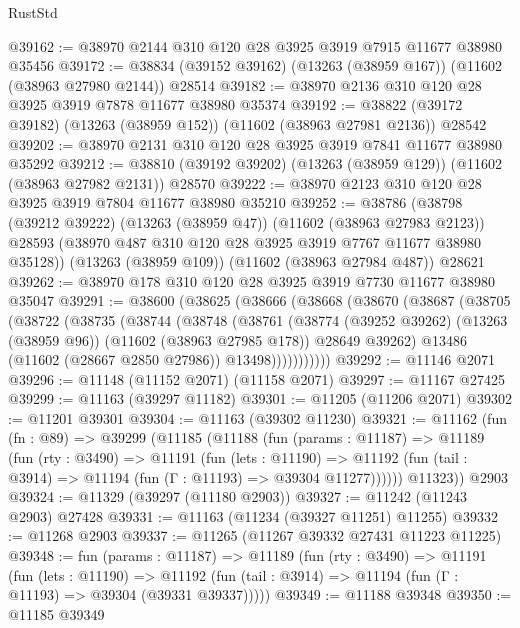 \begin{lexlean}{RustStd}
\begin{coremodule}
@39162 := @38970 @2144 @310 @120 @28 @3925 @3919 @7915 @11677 @38980 @35456
@39172 := @38834 (@39152 @39162) (@13263 (@38959 @167)) (@11602 (@38963 @27980 @2144)) @28514
@39182 := @38970 @2136 @310 @120 @28 @3925 @3919 @7878 @11677 @38980 @35374
@39192 := @38822 (@39172 @39182) (@13263 (@38959 @152)) (@11602 (@38963 @27981 @2136)) @28542
@39202 := @38970 @2131 @310 @120 @28 @3925 @3919 @7841 @11677 @38980 @35292
@39212 := @38810 (@39192 @39202) (@13263 (@38959 @129)) (@11602 (@38963 @27982 @2131)) @28570
@39222 := @38970 @2123 @310 @120 @28 @3925 @3919 @7804 @11677 @38980 @35210
@39252 := @38786
    (@38798
      (@39212 @39222)
      (@13263 (@38959 @47))
      (@11602 (@38963 @27983 @2123))
      @28593
      (@38970 @487 @310 @120 @28 @3925 @3919 @7767 @11677 @38980 @35128))
    (@13263 (@38959 @109))
    (@11602 (@38963 @27984 @487))
    @28621
@39262 := @38970 @178 @310 @120 @28 @3925 @3919 @7730 @11677 @38980 @35047
@39291 := @38600
    (@38625
      (@38666
        (@38668
          (@38670
            (@38687
              (@38705
                (@38722
                  (@38735
                    (@38744
                      (@38748
                        (@38761
                          (@38774
                            (@39252 @39262)
                            (@13263 (@38959 @96))
                            (@11602 (@38963 @27985 @178))
                            @28649
                            @39262)
                          @13486
                          (@11602 (@28667 @2850 @27986))
                          @13498)))))))))))
@39292 := @11146 @2071
@39296 := @11148 (@11152 @2071) (@11158 @2071)
@39297 := @11167 @27425
@39299 := @11163 (@39297 @11182)
@39301 := @11205 (@11206 @2071)
@39302 := @11201 @39301
@39304 := @11163 (@39302 @11230)
@39321 := @11162
    (fun (fn : @89) =>
    @39299
      (@11185
        (@11188
          (fun (params : @11187) =>
          @11189
            (fun (rty : @3490) =>
            @11191
              (fun (lets : @11190) =>
              @11192 (fun (tail : @3914) => @11194 (fun (Γ : @11193) => @39304 @11277))))))
        @11323))
    @2903
@39324 := @11329 (@39297 (@11180 @2903))
@39327 := @11242 (@11243 @2903) @27428
@39331 := @11163 (@11234 (@39327 @11251) @11255)
@39332 := @11268 @2903
@39337 := @11265 (@11267 @39332 @27431 @11223 @11225)
@39348 := fun (params : @11187) =>
  @11189
    (fun (rty : @3490) =>
    @11191
      (fun (lets : @11190) =>
      @11192 (fun (tail : @3914) => @11194 (fun (Γ : @11193) => @39304 (@39331 @39337)))))
@39349 := @11188 @39348
@39350 := @11185 @39349

\end{coremodule}
\end{lexlean}
